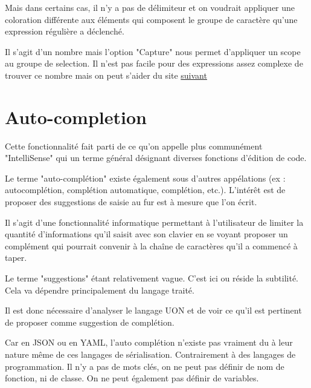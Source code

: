 \documentclass[
    iict, %
    il, %
]{heig-tb}
\begin{document}

Mais dans certains cas, il n'y a pas de délimiteur et on voudrait appliquer une coloration différente aux éléments qui composent le groupe de caractère qu'une expression régulière
a déclenché.


Il s'agit d'un nombre mais l'option "Capture" nous permet d'appliquer un scope au groupe de selection.
Il n'est pas facile pour des expressions assez complexe de trouver ce nombre mais on peut s'aider du site \href{https://regex101.com/}{suivant}



\section{Auto-completion}

Cette fonctionnalité fait parti de ce qu'on appelle plus communément "IntelliSense" \cite{intelliSense} qui un terme général désignant diverses fonctions d'édition de code.

Le terme "auto-complétion" existe également sous d'autres appélations (ex : autocomplétion, complétion automatique, complétion, etc.).
L'intérêt est de proposer des suggestions de saisie au fur est à mesure que l'on écrit.

Il s'agit d'une fonctionnalité informatique permettant à l'utilisateur de limiter la quantité d'informations qu'il saisit avec son clavier
en se voyant proposer un complément qui pourrait convenir à la chaîne de caractères qu'il a commencé à taper.

Le terme "suggestions" étant relativement vague. C'est ici ou réside la subtilité. Cela va dépendre principalement du langage traité.

Il est donc nécessaire d'analyser le langage UON et de voir ce qu'il est pertinent de proposer comme suggestion de complétion.

Car en JSON ou en YAML, l'auto complétion n'existe pas vraiment du à leur nature même de ces langages de sérialisation.
Contrairement à des langages de programmation. Il n'y a pas de mots clés, on ne peut pas définir de nom de fonction, ni de classe. On ne peut également pas définir de variables.
\end{document}
